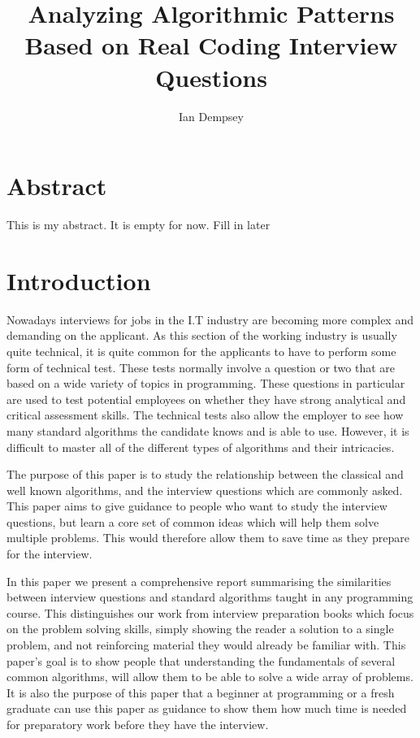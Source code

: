 \documentclass[10pt,twocolumn]{IEEEtran}
\title{Analyzing Algorithmic Patterns Based on Real Coding Interview Questions}
\author{Ian Dempsey}
\begin{document}
\maketitle
{}
\newpage
{}
\section{Abstract}
This is my abstract. It is empty for now. Fill in later
\section{Introduction}
\label{sec:intro}
\par
Nowadays interviews for jobs in the I.T industry are becoming more complex and demanding on the applicant. As this section of the working industry is usually quite technical, it is quite common for the applicants to have to perform some form of technical test. These tests normally involve a question or two that are based on a wide variety of topics in programming. These questions in particular are used to test potential employees on whether they have strong analytical and critical assessment skills. The technical tests also allow the employer to see how many standard algorithms the candidate knows and is able to use. However, it is difficult to master all of the different types of algorithms and their intricacies. 
\par The purpose of this paper is to study the relationship between the classical and well known algorithms, and the interview questions which are commonly asked.  This paper aims to give guidance to people who want to study the interview questions, but learn a core set of common ideas which will help them solve multiple problems. This would therefore allow them to save time as they prepare for the interview.
\par In this paper we present a comprehensive report summarising the similarities between interview questions and standard algorithms taught in any programming course. This distinguishes our work from interview preparation books which focus on the problem solving skills, simply showing the reader a solution to a single problem, and not reinforcing material they would already be familiar with. This paper's goal is to show people that understanding the fundamentals of several common algorithms, will allow them to be able to solve a wide array of problems. It is also the purpose of this paper that a beginner at programming or a fresh graduate can use this paper as guidance to show them how much time is needed for preparatory work before they have the interview.  
\end{document}
